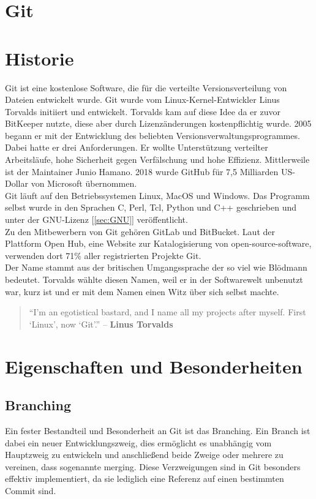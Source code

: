 \newpage
\clearpage
\section{Git}
\section*{Historie}
Git ist eine kostenlose Software, die für die verteilte Versionsverteilung von Dateien entwickelt wurde. Git wurde vom Linux-Kernel-Entwickler Linus Torvalds initiiert und entwickelt. Torvalds kam auf diese Idee da er zuvor BitKeeper nutzte, diese aber durch Lizenzänderungen kostenpflichtig wurde. 2005 begann er mit der Entwicklung des beliebten Versionsverwaltungsprogrammes. Dabei hatte er drei Anforderungen. Er wollte Unterstützung verteilter Arbeitsläufe, hohe Sicherheit gegen Verfälschung und hohe Effizienz. Mittlerweile ist der Maintainer Junio Hamano. 2018 wurde GitHub für 7,5 Milliarden US-Dollar von Microsoft übernommen. \\
Git läuft auf den Betriebssystemen Linux, MacOS und Windows. Das Programm selbst wurde in den Sprachen C, Perl, Tcl, Python und C++ geschrieben und unter der GNU-Lizenz [\ref{sec:GNU}] veröffentlicht. 
\\
Zu den Mitbewerbern von Git gehören GitLab und BitBucket. Laut der Plattform Open Hub, eine Website zur Katalogisierung von open-source-software, verwenden dort 71\% aller registrierten Projekte Git. \cite{GitMarketshare}
\\
Der Name stammt aus der britischen Umgangssprache der so viel wie Blödmann bedeutet. Torvalds wählte diesen Namen, weil er in der Softwarewelt unbenutzt war, kurz ist und er mit dem Namen einen Witz über sich selbst machte.
\\
\begin{quote}
	“I’m an egotistical bastard, and I name all my projects after myself. First ‘Linux’, now ‘Git’.” – \textbf{Linus Torvalds} \cite{TorvaldsJoke} 
\end{quote}
\clearpage
\newpage
\section*{Eigenschaften und Besonderheiten}
\subsection*{Branching}
Ein fester Bestandteil und Besonderheit an Git ist das Branching. Ein Branch ist dabei ein neuer Entwicklungszweig, dies ermöglicht es unabhängig vom Hauptzweig zu entwickeln und anschließend beide Zweige oder mehrere zu vereinen, dass sogenannte merging. Diese Verzweigungen sind in Git besonders effektiv implementiert, da sie lediglich eine Referenz auf einen bestimmten Commit sind.



